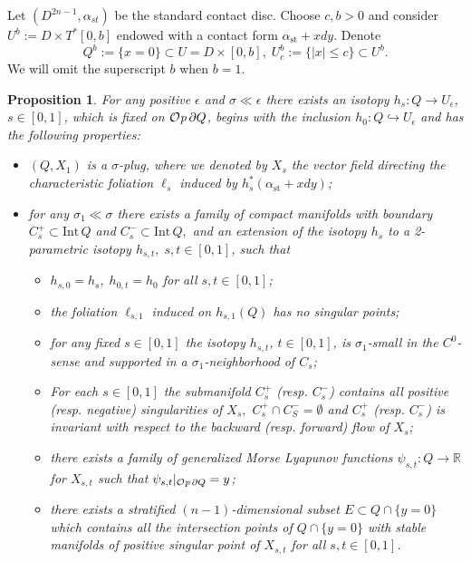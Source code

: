 \documentclass[12pt]{amsart}
\theoremstyle{plain}
\newtheorem{prop}[theorem]{Proposition}
\theoremstyle{definition}
\theoremstyle{remark}
\newcommand{\R}{\mathbb{R}}
\newcommand{\eps}{\epsilon}
\newcommand{\p}{\partial}
\newcommand{\Int}{\mathrm{Int\,}}
\newcommand{\Op}{ {\mathcal O}{\it p}\,}
\newcommand{\st}{\mathrm{st}}
\begin{document}
Let $(D^{2n-1},\alpha_{st})$ be the standard contact disc. Choose $c,b>0$ and 
consider $U^b:=D\times T^*[0,b]$ endowed with a contact form $\alpha_\st+xdy$.
Denote $$Q^b:=\{x=0\}\subset  U=D\times[0,b],\; U^b_c:=\{|x|\leq c\}\subset U^b.$$
We will omit the superscript $b$ when $b=1$.
\begin{prop}\label{prop:main-plug}
  For any  positive $ \eps$ and $\sigma\ll\eps$ there exists an    isotopy
 $ h_{s}: Q\to  U_\eps$, $s\in [0,1]$, which is fixed on $\Op \p  Q$, begins with       the inclusion $h_0: Q\hookrightarrow U_\eps$ and has the following properties:
 \begin{itemize}
  \item[a)] $(Q,X_{1})$ is a $\sigma$-plug, where we denoted by $X_{s}$ the vector field directing the characteristic foliation $\ell_{s}$    induced by $h_{s}^*(\alpha_\st+xdy)$; 
 \item[b)] for any $\sigma_1\ll\sigma$ there exists a family of compact  manifolds with boundary $C^+_s\subset\Int  Q$ and $C^-_s\subset\Int  Q,$ and an extension of  the isotopy $h_s$ to a 2-parametric isotopy
 $h_{s,t}, \; s,t\in[0,1]$,  such that
 \begin{itemize}
 \item[(i)] $h_{s,0}=h_s,\; h_{0,t}=h_0$ for all $s,t \in[0,1]$;
  \item the foliation $\ell_{s,1}$  induced on $h_{s,1}( Q)$ has no singular points;
  \item[(ii)]  for any fixed $s\in[0,1]$ the isotopy $h_{s,t}$, $t\in[0,1]$, is $\sigma_1$-small in the $C^0$-sense and supported in a $\sigma_1$-neighborhood of $C_s$;
  \item[(iii)] For each $s\in[0,1]$ the submanifold $C^+_s$ (resp. $C_s^-$)  contains all positive (resp. negative) singularities of $X_s,$ $C_s^+ \cap 
  C_S^- = \emptyset$ and $C^+_s$ (resp. $C^-_s$) is  invariant with respect  to the backward (resp. forward) flow of $X_s$;
 
 \item[(iv)]  there exists a family of  generalized Morse  Lyapunov functions $\psi_{s,t}:Q\to\R$ for $X_{s,t}$ such that  $\psi_{s,t}|_{\Op\p  Q}=y$;
 \item[(v)] there exists a stratified  $(n-1)$-dimensional subset $E\subset  Q\cap\{y=0\}$ which contains all  the intersection points of $Q\cap\{y=0\}$ with stable manifolds of   positive singular point of $X_{s,t}$ for all $s,t\in[0,1]$.  
  \end{itemize}
  \end{itemize}
   \end{prop}
 
\end{document}
